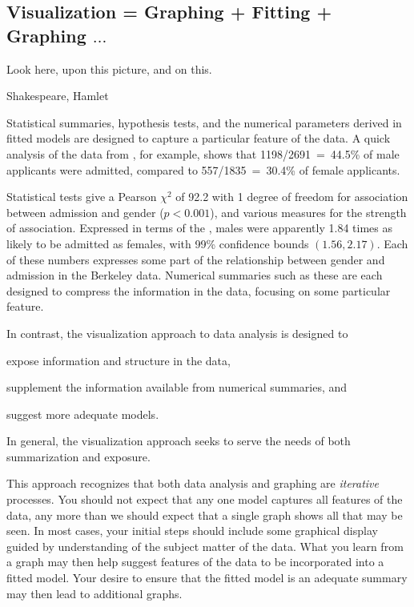 \documentclass[10pt,krantz2]{krantz}\usepackage[]{graphicx}\usepackage[]{color}
\begin{document}
\subsection{Visualization = Graphing + Fitting + Graphing $\dots$}\label{sec:vis}
\epigraph{Look here, upon this picture, and on this.}{Shakespeare, Hamlet}

Statistical summaries, hypothesis tests, and the numerical parameters
derived in fitted models are designed to capture a particular feature of the
data.  A quick analysis of the data from , for example,
shows that
1198/2691~=~44.5\% of male applicants were admitted, compared to
557/1835~=~30.4\% of female applicants.

Statistical tests
give a Pearson $\chi^2$ of 92.2
with 1 degree of freedom
for association between admission and gender ($p < 0.001$), and
various measures for the strength of association.
%
Expressed in terms of the , males were apparently
1.84 times as likely
to be admitted as females, with 99\% confidence bounds
$\left(1.56, 2.17\right)$.
Each of these numbers expresses some part of the relationship between
gender and admission in the Berkeley data.
Numerical summaries such as these are each
designed to compress the information in the data, focusing on some particular
feature.

In contrast, the visualization approach to data analysis is designed
to
\begin{seriate}
\item expose information and structure in the data,
\item supplement the information available from numerical summaries, and
\item suggest more adequate models.
\end{seriate}
In general, the visualization approach seeks to serve the needs of
both summarization and exposure.

This approach recognizes that both data analysis and graphing are
\emph{iterative} processes.
You should not expect that any one model captures all features of the
data, any more than we should expect that a single graph shows all that
may be seen.  In most cases, your initial steps should include some
graphical display guided by understanding of the subject matter
of the data.
What you learn from a graph may then help suggest features of the data
to be incorporated into a fitted model.
Your desire to ensure that the fitted model is an adequate summary
may then lead to additional graphs.
\end{document}
